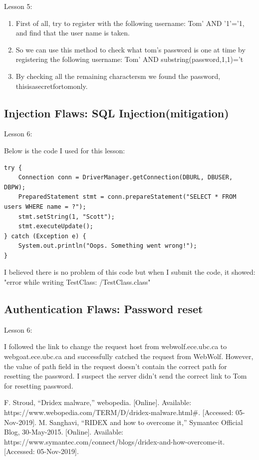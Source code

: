 \documentclass[conference]{IEEEtran}
\begin{document}
Lesson 5:
\begin{enumerate}
\item  First of all, try to register with the following username: Tom' AND '1'='1, and find that the user name is taken.
\item So we can use this method to check what tom's password is one at time by registering the following username: Tom' AND substring(password,1,1)='t
\item By checking all the remaining charactersm we found the password, thisisasecretfortomonly.
\end{enumerate}

\subsection{Injection Flaws: SQL Injection(mitigation)}
Lesson 6:

Below is the code I used for this lesson: 
\begin{lstlisting}
try {
	Connection conn = DriverManager.getConnection(DBURL, DBUSER, DBPW);
	PreparedStatement stmt = conn.prepareStatement("SELECT * FROM users WHERE name = ?");
	stmt.setString(1, "Scott");
	stmt.executeUpdate();
} catch (Exception e) {
    System.out.println("Oops. Something went wrong!");
}
\end{lstlisting}
I believed there is no problem of this code but when I submit the code, it showed: "error while writing TestClass: /TestClass.class"

\subsection{Authentication Flaws: Password reset}
Lesson 6:

I followed the link to change the request host from webwolf.ece.ubc.ca to webgoat.ece.ubc.ca and successfully catched the request from WebWolf. However, the value of path field in the request doesn't contain the correct path for resetting the password. I suspect the server didn't send the correct link to Tom for resetting password.

\begin{thebibliography}{00}
 F. Stroud, “Dridex malware,” webopedia. [Online]. Available: https://www.webopedia.com/TERM/D/dridex-malware.html\#. [Accessed: 05-Nov-2019].
 M. Sanghavi, “RIDEX and how to overcome it,” Symantec Official Blog, 30-May-2015. [Online]. Available: https://www.symantec.com/connect/blogs/dridex-and-how-overcome-it. [Accessed: 05-Nov-2019].

\end{thebibliography}
\end{document}
